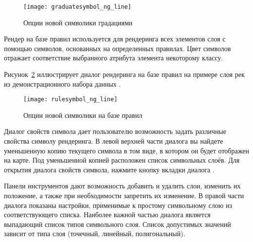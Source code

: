 \begin{figure}[ht]
   \centering
   \texttt{[image: graduatesymbol\_ng\_line]}
   \caption{Опции новой символики градациями \wincaption}\label{fig:gradsymNG}
\end{figure}


Рендер на базе правил используется для рендеринга всех элементов слоя с помощью
символов, основанных на определенных правилах. Цвет символов отражает
соответствие выбранного атрибута элемента некоторому классу.


Рисунок~\ref{fig:rulesymNG} иллюстрирует диалог рендеринга на базе правил
на примере слоя рек из демонстрационного набора данных \qg.

\begin{figure}[ht]
   \centering
   \texttt{[image: rulesymbol\_ng\_line]}
   \caption{Опции новой символики на базе правил \wincaption}\label{fig:rulesymNG}
\end{figure}


Диалог свойств символа дает пользователю возможность задать различные свойства
символу рендеринга. В левой верхней части диалога вы найдете уменьшенную копию
текущего символа в том виде, в котором он будет отображен на карте. Под
уменьшенной копией расположен список символьных слоёв. Для открытия диалога
свойств символа, нажмите кнопку 
вкладки  диалога .

Панели инструментов дают возможность добавить и удалить слои, изменить их
положение, а также при необходимости запретить их изменение. В правой части
диалога показаны настройки, применимые к простому символьному слою из
соответствующего списка. Наиболее важной частью диалога является выпадающий
список типов символьного слоя. Список допустимых значений зависит от типа слоя
(точечный, линейный, полигональный).

